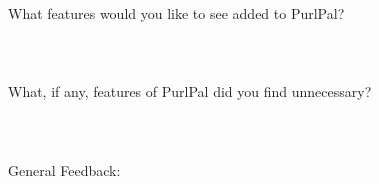 \documentclass{article}
\begin{document}
{{\begin{enumerate}
      \\ \\ \\
      What features would you like to see added to PurlPal?
      \\ \\ \\ \\
      What, if any, features of PurlPal did you find unnecessary?
      \\ \\ \\ \\
      General Feedback:
      \\ \\ \\ \\
    \end{enumerate}
  }%
}
\end{document}
